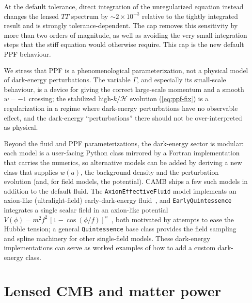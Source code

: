 \documentclass[prd, twocolumn, superscriptaddress, tightenlines, longbibliography, nofootinbib, eqsecnum, amsfonts, amsmath, floatfix, notitlepage]{revtex4-2}
\begin{document}
At the default tolerance, direct integration of the unregularized equation
instead changes the lensed $TT$ spectrum by $\sim2\times10^{-3}$ relative to
the tightly integrated result and is strongly tolerance-dependent. The cap
removes this sensitivity by more than two orders of magnitude, as well as
avoiding the very small integration steps that the stiff equation would
otherwise require. This cap is the new default PPF behaviour.


We stress that PPF is a phenomenological parameterization, not a physical model of
dark-energy perturbations. The variable $\Gamma$, and especially its small-scale
behaviour, is a device for giving the correct large-scale momentum and a smooth
$w=-1$ crossing; the stabilized high-$k/\mathcal H$ evolution
(\cref{eq:ppf-fix}) is a regularization in a regime where dark-energy
perturbations have no observable effect, and the dark-energy ``perturbations''
there should not be over-interpreted as physical.

Beyond the fluid and PPF parameterizations, the dark-energy sector is modular:
each model is a user-facing Python class mirrored by a Fortran implementation
that carries the numerics, so alternative models can be added by deriving a new
class that supplies $w(a)$, the background density and the perturbation evolution
(and, for field models, the potential). \textsc{CAMB} ships a few such models in
addition to the default fluid. The \texttt{AxionEffectiveFluid} model implements
an axion-like (ultralight-field) early-dark-energy fluid~\cite{Poulin:2018dzj},
and \texttt{EarlyQuintessence} integrates a single scalar field in an axion-like
potential $V(\phi)=m^2f^2\,[1-\cos(\phi/f)]^n$~\cite{Smith:2019ihp}, both
motivated by attempts to ease the Hubble tension; a general \texttt{Quintessence}
base class provides the field sampling and spline machinery for other
single-field models. These dark-energy implementations can serve as worked
examples of how to add a custom dark-energy class.

\section{Lensed CMB and matter power}
\label{sec:lensing}
\end{document}
